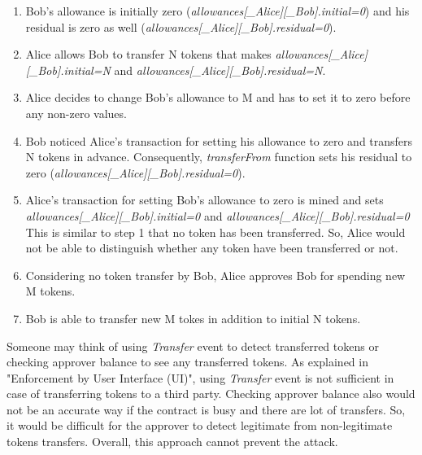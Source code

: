 \begin{enumerate}
	\item Bob’s allowance is initially zero (\textit{allowances[\_Alice][\_Bob].initial=0}) and his residual is zero as well (\textit{allowances[\_Alice][\_Bob].residual=0}).
	\item Alice allows Bob to transfer N tokens that makes \textit{allowances[\_Alice][\_Bob].initial=N} and \textit{allowances[\_Alice][\_Bob].residual=N}.
	\item Alice decides to change Bob’s allowance to M and has to set it to zero before any non-zero values.
	\item Bob noticed Alice’s transaction for setting his allowance to zero and transfers N tokens in advance. Consequently, \textit{transferFrom} function sets his residual to zero (\textit{allowances[\_Alice][\_Bob].residual=0}).
	\item Alice’s transaction for setting Bob's allowance to zero is mined and sets \textit{allowances[\_Alice][\_Bob].initial=0} and \textit{allowances[\_Alice][\_Bob].residual=0} This is similar to step 1 that no token has been transferred. So, Alice would not be able to distinguish whether any token have been transferred or not.
	\item Considering no token transfer by Bob, Alice approves Bob for spending new M tokens.
	\item Bob is able to transfer new M tokes in addition to initial N tokens.\newline
\end{enumerate}
Someone may think of using \textit{Transfer} event to detect transferred tokens or checking approver balance to see any transferred tokens. As explained in "Enforcement by User Interface (UI)", using \textit{Transfer} event is not sufficient in case of transferring tokens to a third party. Checking approver balance also would not be an accurate way if the contract is busy and there are lot of transfers. So, it would be difficult for the approver to detect legitimate from non-legitimate tokens transfers. Overall, this approach cannot prevent the attack.

